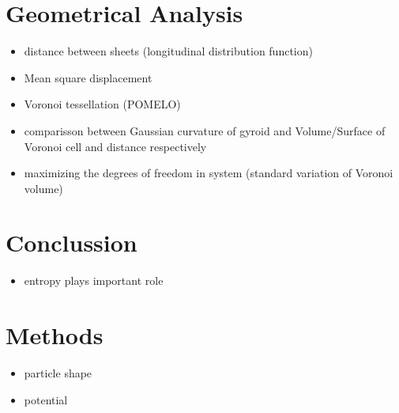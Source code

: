 \documentclass[epj,twocolumn]{webofc}
\begin{document}
\section{Geometrical Analysis}
\label{sec:GeometricalAnalysis}

\begin{itemize}
    \item distance between sheets (longitudinal distribution function)
    \item Mean square displacement
    \item Voronoi tessellation (POMELO)
    \item comparisson between Gaussian curvature of gyroid and Volume/Surface of Voronoi cell and distance respectively
    \item maximizing the degrees of freedom in system (standard variation of Voronoi volume)
\end{itemize}

\section{Conclussion}
\label{sec:Conclussion}

\begin{itemize}
    \item entropy plays important role
\end{itemize}

\section{Methods}
\label{sec:Methods}

\begin{itemize}
    \item particle shape
    \item potential
\end{itemize}
\end{document}
